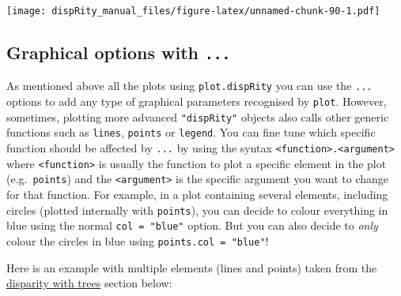\documentclass[
]{book}
\begin{document}
\texttt{[image: dispRity\_manual\_files/figure-latex/unnamed-chunk-90-1.pdf]}

\hypertarget{graphical-options-with-...}{%
\subsection{\texorpdfstring{Graphical options with \texttt{...}}{Graphical options with ...}}\label{graphical-options-with-...}}

As mentioned above all the plots using \texttt{plot.dispRity} you can use the \texttt{...} options to add any type of graphical parameters recognised by \texttt{plot}.
However, sometimes, plotting more advanced \texttt{"dispRity"} objects also calls other generic functions such as \texttt{lines}, \texttt{points} or \texttt{legend}.
You can fine tune which specific function should be affected by \texttt{...} by using the syntax \texttt{\textless{}function\textgreater{}.\textless{}argument\textgreater{}} where \texttt{\textless{}function\textgreater{}} is usually the function to plot a specific element in the plot (e.g.~\texttt{points}) and the \texttt{\textless{}argument\textgreater{}} is the specific argument you want to change for that function.
For example, in a plot containing several elements, including circles (plotted internally with \texttt{points}), you can decide to colour everything in blue using the normal \texttt{col\ =\ "blue"} option.
But you can also decide to \emph{only} colour the circles in blue using \texttt{points.col\ =\ "blue"}!

Here is an example with multiple elements (lines and points) taken from the \protect\hyperlink{dispRitree}{disparity with trees} section below:
\end{document}
